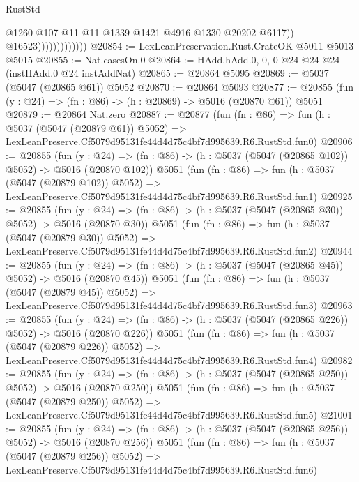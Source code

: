 \begin{lexlean}{RustStd}
\begin{coremodule}
                                  @1260
                                  @107
                                  @11
                                  @11
                                  @1339
                                  @1421
                                  @4916
                                  @1330
                                  @20202
                                  @6117))
                              @16523)))))))))))))
@20854 := LexLeanPreservation.Rust.CrateOK @5011 @5013 @5015
@20855 := Nat.casesOn.{0}
@20864 := HAdd.hAdd.{0, 0, 0} @24 @24 @24 (instHAdd.{0} @24 instAddNat)
@20865 := @20864 @5095
@20869 := @5037 (@5047 (@20865 @61)) @5052
@20870 := @20864 @5093
@20877 := @20855 (fun (y : @24) => (fn : @86) -> (h : @20869) -> @5016 (@20870 @61)) @5051
@20879 := @20864 Nat.zero
@20887 := @20877
    (fun (fn : @86) =>
    fun (h : @5037 (@5047 (@20879 @61)) @5052) =>
    LexLeanPreserve.Cf5079d95131fe44d4d75c4bf7d995639.R6.RustStd.fun0)
@20906 := @20855
    (fun (y : @24) => (fn : @86) -> (h : @5037 (@5047 (@20865 @102)) @5052) -> @5016 (@20870 @102))
    @5051
    (fun (fn : @86) =>
    fun (h : @5037 (@5047 (@20879 @102)) @5052) =>
    LexLeanPreserve.Cf5079d95131fe44d4d75c4bf7d995639.R6.RustStd.fun1)
@20925 := @20855
    (fun (y : @24) => (fn : @86) -> (h : @5037 (@5047 (@20865 @30)) @5052) -> @5016 (@20870 @30))
    @5051
    (fun (fn : @86) =>
    fun (h : @5037 (@5047 (@20879 @30)) @5052) =>
    LexLeanPreserve.Cf5079d95131fe44d4d75c4bf7d995639.R6.RustStd.fun2)
@20944 := @20855
    (fun (y : @24) => (fn : @86) -> (h : @5037 (@5047 (@20865 @45)) @5052) -> @5016 (@20870 @45))
    @5051
    (fun (fn : @86) =>
    fun (h : @5037 (@5047 (@20879 @45)) @5052) =>
    LexLeanPreserve.Cf5079d95131fe44d4d75c4bf7d995639.R6.RustStd.fun3)
@20963 := @20855
    (fun (y : @24) => (fn : @86) -> (h : @5037 (@5047 (@20865 @226)) @5052) -> @5016 (@20870 @226))
    @5051
    (fun (fn : @86) =>
    fun (h : @5037 (@5047 (@20879 @226)) @5052) =>
    LexLeanPreserve.Cf5079d95131fe44d4d75c4bf7d995639.R6.RustStd.fun4)
@20982 := @20855
    (fun (y : @24) => (fn : @86) -> (h : @5037 (@5047 (@20865 @250)) @5052) -> @5016 (@20870 @250))
    @5051
    (fun (fn : @86) =>
    fun (h : @5037 (@5047 (@20879 @250)) @5052) =>
    LexLeanPreserve.Cf5079d95131fe44d4d75c4bf7d995639.R6.RustStd.fun5)
@21001 := @20855
    (fun (y : @24) => (fn : @86) -> (h : @5037 (@5047 (@20865 @256)) @5052) -> @5016 (@20870 @256))
    @5051
    (fun (fn : @86) =>
    fun (h : @5037 (@5047 (@20879 @256)) @5052) =>
    LexLeanPreserve.Cf5079d95131fe44d4d75c4bf7d995639.R6.RustStd.fun6)

\end{coremodule}
\end{lexlean}
